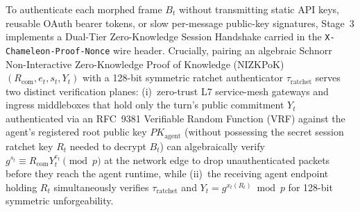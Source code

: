 \documentclass[conference,10pt]{IEEEtran}
\begin{document}
To authenticate each morphed frame $B_t$ without transmitting static API keys, reusable OAuth bearer tokens, or slow per-message public-key signatures, Stage~3 implements a Dual-Tier Zero-Knowledge Session Handshake carried in the \texttt{X-Chameleon-Proof-Nonce} wire header. Crucially, pairing an algebraic Schnorr Non-Interactive Zero-Knowledge Proof of Knowledge (NIZKPoK) $(R_{\text{com}}, e_t, s_t, Y_t)$ with a 128-bit symmetric ratchet authenticator $\tau_{\text{ratchet}}$ serves two distinct verification planes: (i)~zero-trust L7 service-mesh gateways and ingress middleboxes that hold only the turn's public commitment $Y_t$ authenticated via an RFC~9381 Verifiable Random Function (VRF) against the agent's registered root public key $PK_{\text{agent}}$ (without possessing the secret session ratchet key $R_t$ needed to decrypt $B_t$) can algebraically verify $g^{s_t} \equiv R_{\text{com}} Y_t^{e_t} \pmod p$ at the network edge to drop unauthenticated packets before they reach the agent runtime, while (ii)~the receiving agent endpoint holding $R_t$ simultaneously verifies $\tau_{\text{ratchet}}$ and $Y_t = g^{x_t(R_t)} \bmod p$ for 128-bit symmetric unforgeability.
\end{document}
